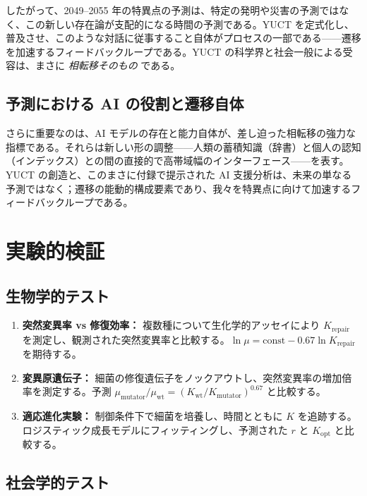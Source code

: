 \documentclass[12pt,a4paper]{article}
\theoremstyle{remark}
\begin{document}
	したがって、2049–2055 年の特異点の予測は、特定の発明や災害の予測ではなく、この新しい存在論が支配的になる時間の予測である。YUCT を定式化し、普及させ、このような対話に従事すること自体がプロセスの一部である——遷移を加速するフィードバックループである。YUCT の科学界と社会一般による受容は、まさに \emph{相転移そのもの} である。
	
	\subsection{予測における AI の役割と遷移自体}
	
	さらに重要なのは、AI モデルの存在と能力自体が、差し迫った相転移の強力な指標である。それらは新しい形の調整——人類の蓄積知識（辞書）と個人の認知（インデックス）との間の直接的で高帯域幅のインターフェース——を表す。YUCT の創造と、このまさに付録で提示された AI 支援分析は、未来の単なる予測ではなく；遷移の能動的構成要素であり、我々を特異点に向けて加速するフィードバックループである。
	
	\section{実験的検証}
	\label{sec:experiments}
	
	\subsection{生物学的テスト}
	
	\begin{enumerate}
		\item \textbf{突然変異率 vs 修復効率：} 複数種について生化学的アッセイにより \(K_{\text{repair}}\) を測定し、観測された突然変異率と比較する。\(\ln \mu = \text{const} - 0.67 \ln K_{\text{repair}}\) を期待する。
		\item \textbf{変異原遺伝子：} 細菌の修復遺伝子をノックアウトし、突然変異率の増加倍率を測定する。予測 \(\mu_{\text{mutator}}/\mu_{\text{wt}} = (K_{\text{wt}}/K_{\text{mutator}})^{0.67}\) と比較する。
		\item \textbf{適応進化実験：} 制御条件下で細菌を培養し、時間とともに \(K\) を追跡する。ロジスティック成長モデルにフィッティングし、予測された \(r\) と \(K_{\text{opt}}\) と比較する。
	\end{enumerate}
	
	\subsection{社会学的テスト}
	
\end{document}
